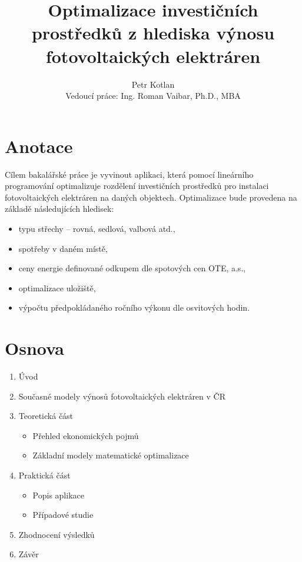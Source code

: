 \documentclass[12pt, aspectratio=169]{beamer} %
\title[Optimalizace FVE]{Optimalizace investičních prostředků z hlediska výnosu fotovoltaických elektráren}
\author[Kotlan]{Petr Kotlan\\ Vedoucí práce: Ing. Roman Vaibar, Ph.D., MBA}
\institute[Přf UJEP]{Přírodovědecká fakulta\\ Univerzita J. E. Purkyně}
\date{}
\begin{document}
\begin{frame}[plain]

    \maketitle
    
\end{frame}

\section{Anotace}

\begin{frame}{\insertsection}
Cílem bakalářské práce je vyvinout aplikaci, která pomocí lineárního programování
optimalizuje rozdělení investičních prostředků pro instalaci fotovoltaických elektráren na daných objektech.
Optimalizace bude provedena na základě následujících hledisek:

\begin{itemize}
    \item typu střechy -- rovná, sedlová, valbová atd.,
    \item spotřeby v daném místě,
    \item ceny energie definované odkupem dle spotových cen OTE, a.s.,
    \item optimalizace uložiště,
    \item výpočtu předpokládaného ročního výkonu dle osvitových hodin.
\end{itemize}

\end{frame}

\section{Osnova}

\begin{frame}{\insertsection}
    \begin{enumerate}
        \item Úvod
        \item Současné modely výnosů fotovoltaických elektráren v ČR
        \item Teoretická část
        \begin{itemize}
            \item Přehled ekonomických pojmů
            \item Základní modely matematické optimalizace
        \end{itemize}
        \item Praktická část
        \begin{itemize}
            \item Popis aplikace
            \item Případové studie
        \end{itemize}
        \item Zhodnocení výsledků
        \item Závěr
        
    \end{enumerate}
\end{frame}
\end{document}
